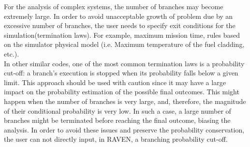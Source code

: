For the analysis of complex systems, the number of branches may become extremely large. In order to avoid unacceptable growth of problem due by an excessive number of branches, the user needs to specify exit conditions for the simulation(termination laws). For example, maximum mission time, rules based on the simulator physical model (i.e. Maximum temperature of the fuel cladding, etc.). 
\\In other similar codes, one of the most common termination laws is a probability cut-off: a branch's execution is stopped when its probability falls below a given limit. 
This approach should be used with caution since it may have a large impact on the probability estimation of the possible final outcomes. This might happen when the number of branches is very large, and, therefore, the magnitude of their conditional probability is very low. In such a case, a large number of branches might be terminated before reaching the final outcome, biasing the analysis.  In order to avoid these issues and preserve the probability conservation, the user can not directly input, in RAVEN, a branching probability cut-off. 
